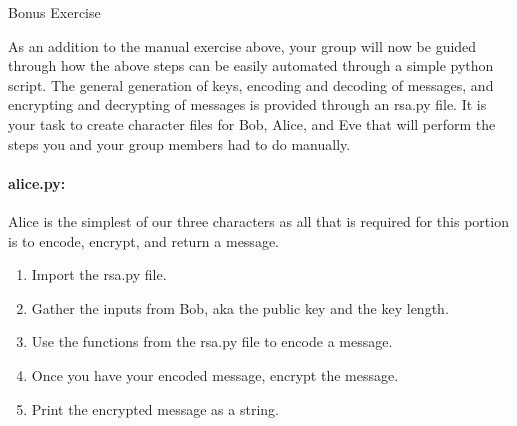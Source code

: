 \documentclass{article}
\begin{document}
    \newpage
    \huge Bonus Exercise
    \normalsize

    As an addition to the manual exercise above, your group will now be guided through how the above steps can be easily automated through a simple python script. The general generation of keys, encoding and decoding of messages, and encrypting and decrypting of messages is provided through an rsa.py file. It is your task to create character files for Bob, Alice, and Eve that will perform the steps you and your group members had to do manually.

    \paragraph{alice.py:} Alice is the simplest of our three characters as all that is required for this portion is to encode, encrypt, and return a message.

    \begin{enumerate}
        \item Import the rsa.py file.

            \TextField[width=6in,height=1in]{}

        \item Gather the inputs from Bob, aka the public key and the key length.
            
            \TextField[width=6in,height=1in]{}

        \item Use the functions from the rsa.py file to encode a message.

            \TextField[width=6in,height=1in]{}

        \item Once you have your encoded message, encrypt the message.

            \TextField[width=6in,height=1in]{}

        \item Print the encrypted message as a string.

            \TextField[width=6in,height=1in]{}

    \end{enumerate}
\end{document}
